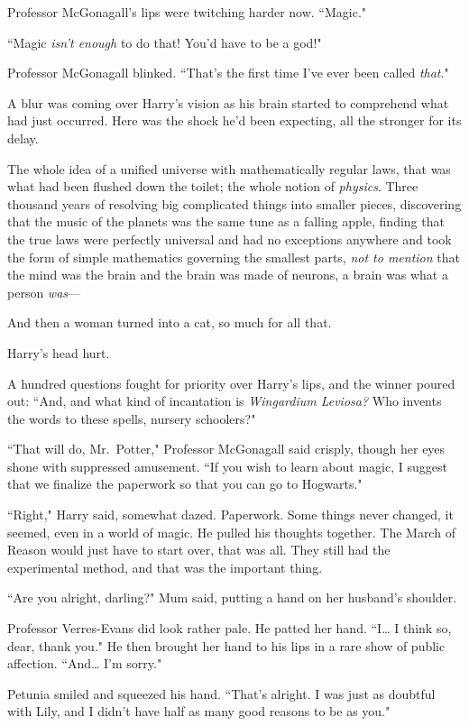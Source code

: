 Professor McGonagall's lips were twitching harder now. ``Magic."

``Magic \emph{isn't enough} to do that! You'd have to be a god!"

Professor McGonagall blinked. ``That's the first time I've ever been called \emph{that}."

A blur was coming over Harry's vision as his brain started to comprehend what had just occurred. Here was the shock he'd been expecting, all the stronger for its delay.

The whole idea of a unified universe with mathematically regular laws, that was what had been flushed down the toilet; the whole notion of \emph{physics}. Three thousand years of resolving big complicated things into smaller pieces, discovering that the music of the planets was the same tune as a falling apple, finding that the true laws were perfectly universal and had no exceptions anywhere and took the form of simple mathematics governing the smallest parts, \emph{not to mention} that the mind was the brain and the brain was made of neurons, a brain was what a person \emph{was}---

And then a woman turned into a cat, so much for all that.

Harry's head hurt.

A hundred questions fought for priority over Harry's lips, and the winner poured out: ``And, and what kind of incantation is \emph{Wingardium Leviosa?} Who invents the words to these spells, nursery schoolers?"

``That will do, Mr.~Potter," Professor McGonagall said crisply, though her eyes shone with suppressed amusement. ``If you wish to learn about magic, I suggest that we finalize the paperwork so that you can go to Hogwarts."

``Right," Harry said, somewhat dazed. Paperwork. Some things never changed, it seemed, even in a world of magic. He pulled his thoughts together. The March of Reason would just have to start over, that was all. They still had the experimental method, and that was the important thing.

``Are you alright, darling?" Mum said, putting a hand on her husband's shoulder.

Professor Verres-Evans did look rather pale. He patted her hand. ``I{\ldots} I think so, dear, thank you." He then brought her hand to his lips in a rare show of public affection. ``And{\ldots} I'm sorry."

Petunia smiled and squeezed his hand. ``That's alright. I was just as doubtful with Lily, and I didn't have half as many good reasons to be as you."


